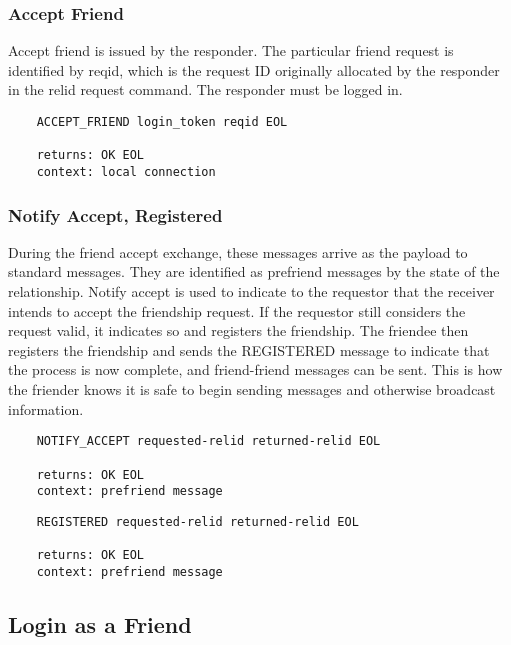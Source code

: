 \documentclass[letterpaper,11pt,oneside]{article}
\begin{document}
\subsubsection{Accept Friend}

Accept friend is issued by the responder. The particular friend request is
identified by reqid, which is the request ID originally allocated by the
responder in the relid request command. The responder must be logged in.

\vspace{10pt}
\begin{verbatim}
    ACCEPT_FRIEND login_token reqid EOL

    returns: OK EOL
    context: local connection
\end{verbatim}
\vspace{10pt}

\subsubsection{Notify Accept, Registered}

During the friend accept exchange, these messages arrive as the payload to
standard messages. They are identified as prefriend messages by the state of the
relationship. Notify accept is used to indicate to the requestor that the
receiver intends to accept the friendship request. If the requestor still
considers the request valid, it indicates so and registers the friendship. The
friendee then registers the friendship and sends the REGISTERED message to
indicate that the process is now complete, and friend-friend messages can be
sent. This is how the friender knows it is safe to begin sending messages and
otherwise broadcast information.

\vspace{10pt}
\begin{verbatim}
    NOTIFY_ACCEPT requested-relid returned-relid EOL

    returns: OK EOL
    context: prefriend message
\end{verbatim}
\vspace{10pt}

\vspace{10pt}
\begin{verbatim}
    REGISTERED requested-relid returned-relid EOL

    returns: OK EOL
    context: prefriend message
\end{verbatim}

\subsection{Login as a Friend}
\end{document}
